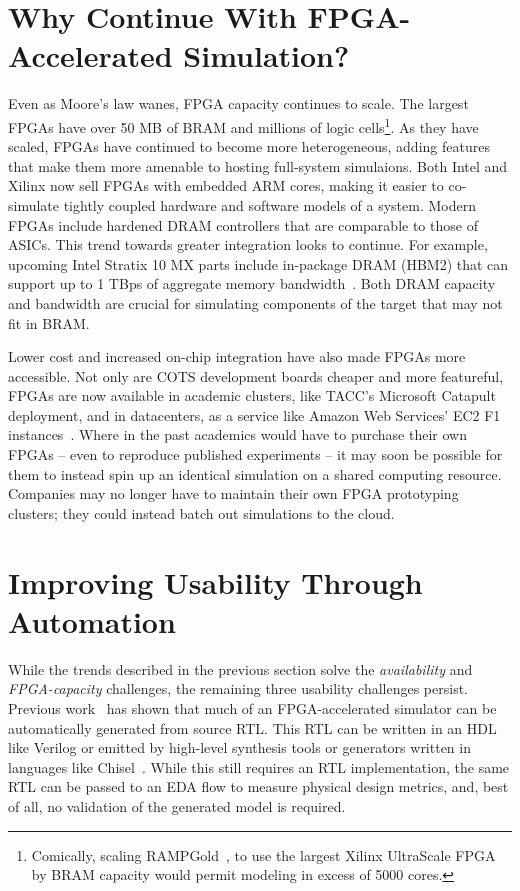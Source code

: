 \section{Why Continue With FPGA-Accelerated Simulation?}

Even as Moore's law wanes, FPGA capacity continues to scale. The largest FPGAs
have over 50 MB of BRAM and millions of logic cells\footnote{Comically, scaling
RAMPGold~\cite{rampgold}, to use the largest Xilinx UltraScale
FPGA~\cite{ultrascale} by BRAM capacity would permit modeling in excess of 5000
cores.}. As they have scaled, FPGAs have continued to become more
heterogeneous, adding features that make them more amenable to hosting
full-system simulaions.  Both Intel and Xilinx now sell FPGAs with embedded ARM
cores, making it easier to co-simulate tightly coupled hardware and software
models of a system. Modern FPGAs include hardened DRAM controllers that are
comparable to those of ASICs. This trend towards greater integration looks to
continue. For example, upcoming Intel Stratix 10 MX parts include in-package DRAM (HBM2)
that can support up to 1 TBps of aggregate memory bandwidth~\cite{stratix10mx}.
Both DRAM capacity and bandwidth are crucial for simulating components
of the target that may not fit in BRAM.

Lower cost and increased on-chip integration have also made FPGAs more
accessible. Not only are COTS development boards cheaper and more featureful,
FPGAs are now available in academic clusters, like TACC's Microsoft
Catapult~\cite{catapultannounce} deployment, and in datacenters, as a service
like Amazon Web Services' EC2 F1 instances~\cite{amazonf1}. Where in the past
academics would have to purchase their own FPGAs -- even to reproduce published
experiments -- it may soon be possible for them to instead spin up an identical
simulation on a shared computing resource. Companies may no longer have to
maintain their own FPGA prototyping clusters; they could instead batch out
simulations to the cloud.

\section{Improving Usability Through Automation}

While the trends described in the previous section solve the
\emph{availability} and \emph{FPGA-capacity} challenges, the remaining three
usability challenges persist. Previous work~\cite{fabscalarfpga, strober} has
shown that much of an FPGA-accelerated simulator can be automatically generated
from source RTL. This RTL can be written in an HDL like Verilog or emitted by
high-level synthesis tools or generators written in languages like
Chisel~\cite{chisel}. While this still requires an RTL implementation, the same
RTL can be passed to an EDA flow to measure physical design metrics, and,
best of all, no validation of the generated model is required.

